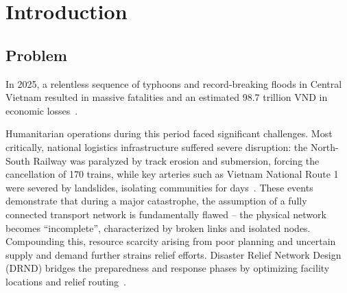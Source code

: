\documentclass{llncs}
\newcommand{\quo}[1]{``#1''}
\begin{document}
\section{Introduction}
\subsection{Problem}

In 2025, a relentless sequence of typhoons and record-breaking floods in Central Vietnam resulted in massive fatalities and an estimated 98.7 trillion VND in economic losses~\cite{VOV2025}.

Humanitarian operations during this period faced significant challenges.
Most critically, national logistics infrastructure suffered severe disruption: the North-South Railway was paralyzed by track erosion and submersion, forcing the cancellation of 170 trains, while key arteries such as Vietnam National Route 1 were severed by landslides, isolating communities for days~\cite{VOV2025}.
These events demonstrate that during a major catastrophe, the assumption of a fully connected transport network is fundamentally flawed -- the physical network becomes \quo{incomplete}, characterized by broken links and isolated nodes.
Compounding this, resource scarcity arising from poor planning and uncertain supply and demand further strains relief efforts.
Disaster Relief Network Design (DRND) bridges the preparedness and response phases by optimizing facility locations and relief routing~\cite{altay2006or}.

\end{document}
